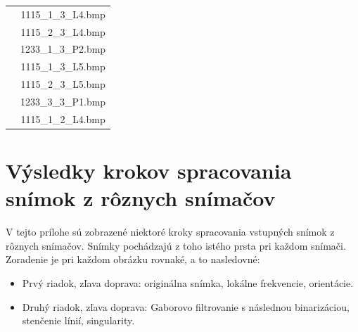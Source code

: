 \begin{table}
\begin{tabular}{ | c | c | }
                          & 1115\_1\_3\_L4.bmp \\
                          & 1115\_2\_3\_L4.bmp \\
                          & 1233\_1\_3\_P2.bmp \\
                          & 1115\_1\_3\_L5.bmp \\
                          & 1115\_2\_3\_L5.bmp \\
                          & 1233\_3\_3\_P1.bmp  \\
                          & 1115\_1\_2\_L4.bmp \\
      \hline
    \end{tabular}
  \end{table}

\chapter{Výsledky krokov spracovania snímok z rôznych snímačov} \label{priloha:vysledky_spracovania}
  V tejto prílohe sú zobrazené niektoré kroky spracovania vstupných snímok z rôznych snímačov. Snímky pochádzajú z toho istého prsta pri každom snímači.
  Zoradenie je pri každom obrázku rovnaké, a to nasledovné:
  \begin{itemize}
    \item Prvý riadok, zľava doprava: originálna snímka, lokálne frekvencie, orientácie.
    \item Druhý riadok, zľava doprava: Gaborovo filtrovanie s následnou binarizáciou, stenčenie línií, singularity.
  \end{itemize}

